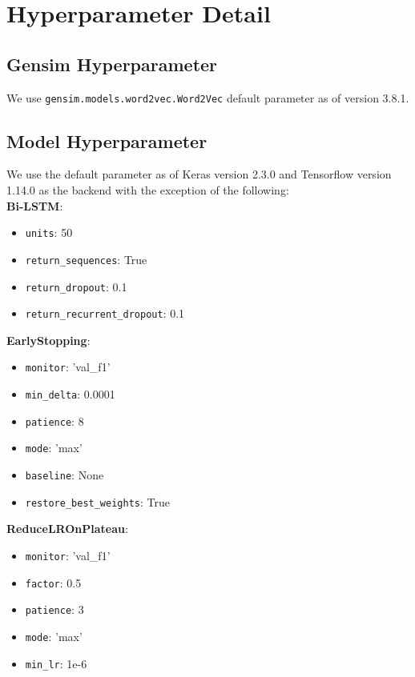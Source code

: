 \documentclass[11pt,a4paper]{article}
\begin{document}
\appendix

\section{Hyperparameter Detail}
\subsection{Gensim Hyperparameter}
We use \verb|gensim.models.word2vec.Word2Vec| default parameter as of version 3.8.1.
\subsection{Model Hyperparameter}
We use the default parameter as of Keras version 2.3.0 and Tensorflow version 1.14.0 as the backend with the exception of the following:
\\

\textbf{Bi-LSTM}:
\begin{itemize}
\item \verb|units|: 50
\item \verb|return_sequences|: True
\item \verb|return_dropout|: 0.1
\item \verb|return_recurrent_dropout|: 0.1
\end{itemize}

\textbf{EarlyStopping}:
\begin{itemize}
\item \verb|monitor|: 'val\_f1'
\item \verb|min_delta|: 0.0001
\item \verb|patience|: 8
\item \verb|mode|: 'max'
\item \verb|baseline|: None
\item \verb|restore_best_weights|: True
\end{itemize}

\textbf{ReduceLROnPlateau}:
\begin{itemize}
\item \verb|monitor|: 'val\_f1'
\item \verb|factor|: 0.5
\item \verb|patience|: 3
\item \verb|mode|: 'max'
\item \verb|min_lr|: 1e-6
\end{itemize}
\end{document}
